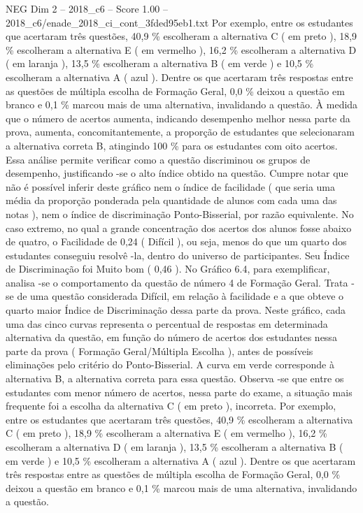 \begin{textsample}{NEG Dim 2 – 2018\_c6 – Score 1.00 – 2018\_c6/enade\_2018\_ci\_cont\_3fded95eb1.txt}
Por exemplo, entre os estudantes que acertaram três questões, 40,9 \% escolheram a alternativa C ( em preto ), 18,9 \% escolheram a alternativa E ( em vermelho ), 16,2 \% escolheram a alternativa D ( em laranja ), 13,5 \% escolheram a alternativa B ( em verde ) e 10,5 \% escolheram a alternativa A ( azul ).
Dentre os que acertaram três respostas entre as questões de múltipla escolha de Formação Geral, 0,0 \% deixou a questão em branco e 0,1 \% marcou mais de uma alternativa, invalidando a questão.
À medida que o número de acertos aumenta, indicando desempenho melhor nessa parte da prova, aumenta, concomitantemente, a proporção de estudantes que selecionaram a alternativa correta B, atingindo 100 \% para os estudantes com oito acertos.
Essa análise permite verificar como a questão discriminou os grupos de desempenho, justificando -se o alto índice obtido na questão.
Cumpre notar que não é possível inferir deste gráfico nem o índice de facilidade ( que seria uma média da proporção ponderada pela quantidade de alunos com cada uma das notas ), nem o índice de discriminação Ponto-Bisserial, por razão equivalente.
No caso extremo, no qual a grande concentração dos acertos dos alunos fosse abaixo de quatro, o Facilidade de 0,24 ( Difícil ), ou seja, menos do que um quarto dos estudantes conseguiu resolvê -la, dentro do universo de participantes.
Seu Índice de Discriminação foi Muito bom ( 0,46 ).
No Gráfico 6.4, para exemplificar, analisa -se o comportamento da questão de número 4 de Formação Geral.
Trata -se de uma questão considerada Difícil, em relação à facilidade e a que obteve o quarto maior Índice de Discriminação dessa parte da prova.
Neste gráfico, cada uma das cinco curvas representa o percentual de respostas em determinada alternativa da questão, em função do número de acertos dos estudantes nessa parte da prova ( Formação Geral/Múltipla Escolha ), antes de possíveis eliminações pelo critério do Ponto-Bisserial.
A curva em verde corresponde à alternativa B, a alternativa correta para essa questão.
Observa -se que entre os estudantes com menor número de acertos, nessa parte do exame, a situação mais frequente foi a escolha da alternativa C ( em preto ), incorreta.
Por exemplo, entre os estudantes que acertaram três questões, 40,9 \% escolheram a alternativa C ( em preto ), 18,9 \% escolheram a alternativa E ( em vermelho ), 16,2 \% escolheram a alternativa D ( em laranja ), 13,5 \% escolheram a alternativa B ( em verde ) e 10,5 \% escolheram a alternativa A ( azul ).
Dentre os que acertaram três respostas entre as questões de múltipla escolha de Formação Geral, 0,0 \% deixou a questão em branco e 0,1 \% marcou mais de uma alternativa, invalidando a questão.

\end{textsample}
